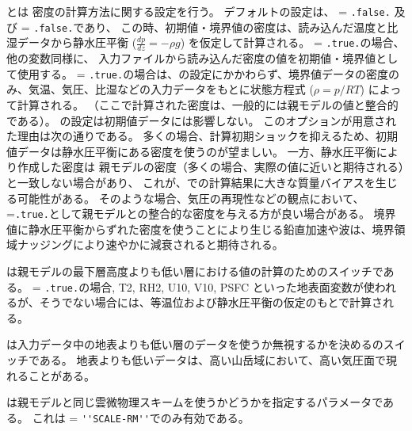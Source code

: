 とは
密度の計算方法に関する設定を行う。
デフォルトの設定は、
 = \verb|.false.| 及び 
 = \verb|.false.|であり、
この時、初期値・境界値の密度は、読み込んだ温度と比湿データから静水圧平衡 ($\frac{dp}{dz}=-\rho g$) を仮定して計算される。
 = \verb|.true.|の場合、他の変数同様に、
入力ファイルから読み込んだ密度の値を初期値・境界値として使用する。
 = \verb|.true.|の場合は、の設定にかかわらず、境界値データの密度のみ、気温、気圧、比湿などの入力データをもとに状態方程式 ($\rho = p/RT$) によって計算される。
（ここで計算された密度は、一般的には親モデルの値と整合的である）。
 の設定は初期値データには影響しない。
このオプションが用意された理由は次の通りである。
多くの場合、計算初期ショックを抑えるため、初期値データは静水圧平衡にある密度を使うのが望ましい。
一方、静水圧平衡により作成した密度は
親モデルの密度（多くの場合、実際の値に近いと期待される）と一致しない場合があり、
これが、\scalerm での計算結果に大きな質量バイアスを生じる可能性がある。
そのような場合、気圧の再現性などの観点において、
=\verb|.true.|として親モデルとの整合的な密度を与える方が良い場合がある。
境界値に静水圧平衡からずれた密度を使うことにより生じる鉛直加速や波は、境界領域ナッジングにより速やかに減衰されると期待される。


は親モデルの最下層高度よりも低い層における値の計算のためのスイッチである。
 = \verb|.true.|の場合, T2, RH2, U10, V10, PSFC といった地表面変数が使われるが、そうでない場合には、等温位および静水圧平衡の仮定のもとで計算される。

は入力データ中の地表よりも低い層のデータを使うか無視するかを決めるのスイッチである。
地表よりも低いデータは、高い山岳域において、高い気圧面で現れることがある。


は親モデルと同じ雲微物理スキームを使うかどうかを指定するパラメータである。
これは = \verb|''SCALE-RM''|でのみ有効である。



